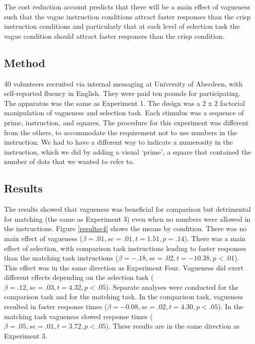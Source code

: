 \documentclass[
a4paper 
, doc
, longtable
]{apa6}
\begin{document}
The cost reduction account predicts that there will be a main effect of vagueness such that the vague instruction conditions attract faster responses than the crisp instruction conditions and particularly that at each level of selection task the vague condition should attract faster responses than the crisp condition.

\subsection{Method}

40 volunteers recruited via internal messaging at University of Aberdeen, with self-reported fluency in English. They were paid ten pounds for participating. 
The apparatus was the same as Experiment 1.
The design was a 2 x 2 factorial manipulation of vagueness and selection task.
Each stimulus was a sequence of prime, instruction, and squares.
The procedure for this experiment was different from the others, to accommodate the requirement not to use numbers in the instruction. We had to have a different way to indicate a numerosity in the instruction, which we did by adding a visual `prime', a square that contained the number of dots that we wanted to refer to.

\subsection{Results}
The results showed that vagueness was beneficial for comparison but detrimental for matching (the same as Experiment 3) even when no numbers were allowed in the instructions. Figure \ref{resultse4} shows the means by condition. There was no main effect of vagueness ($\beta=.01, se=.01, t=1.51, p=.14$). There was a main effect of selection, with comparison task instructions leading to faster responses than the matching task instructions ($\beta=-.18, se=.02, t=-10.38, p<.01$). This effect was in the same direction as Experiment Four. Vagueness did  exert different effects depending on the selection task ($\beta=.12, se=.03, t=4.32, p<.05$). Separate analyses were conducted for the comparison task and for the matching task. In the comparison task, vagueness resulted in faster response times ($\beta=-0.08, se=.02, t=4.30, p<.05$). In the matching task vagueness slowed response times ($\beta=.05, se=.01, t=3.72, p<.05$). These results are in the same direction as Experiment 3.
\end{document}

